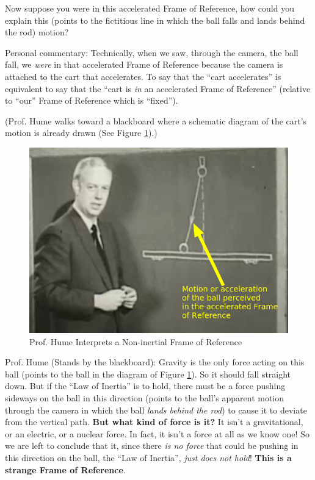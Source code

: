 \documentclass[a6paper]{article}
\newcommand{\perscom}[1]{
    {\footnotesize Personal commentary:  #1}
}
\begin{document}
Now suppose you were in this accelerated Frame of Reference, how could you explain this (points to the fictitious line in which the ball falls and lands behind the rod) motion?

\perscom{ Technically, when we saw, through the camera, the ball fall, we \emph{were} in that accelerated Frame of Reference because the camera is attached to the cart that accelerates. To say that the ``cart accelerates'' is equivalent to say that the ``cart is \emph{in} an accelerated Frame of Reference'' (relative to ``our'' Frame of Reference which is ``fixed'').}

(Prof. Hume walks toward a blackboard where a schematic diagram of the cart's motion is already drawn (See Figure \ref{fig: prof-hume-interprets-non-inertial-frame}).)

        \begin{figure}[h!]
            \centering
            \includegraphics[width=0.5\linewidth]{prof-hume-interprets-non-inertial-frame.png}
            \caption{Prof. Hume Interprets a Non-inertial Frame of Reference}
            \label{fig: prof-hume-interprets-non-inertial-frame}
        \end{figure}

Prof. Hume (Stands by the blackboard): Gravity is the only force acting on this ball (points to the ball in the diagram of Figure \ref{fig: prof-hume-interprets-non-inertial-frame}). So it should fall straight down. But if the ``Law of Inertia'' is to hold, there must be a force pushing sideways on the ball in this direction (points to the ball's apparent motion through the camera in which the ball \emph{lands behind the rod}) to cause it to deviate from the vertical path. \textbf{But what kind of force is it?} It isn't a gravitational, or an electric, or a nuclear force. In fact, it isn't a force at all as we know one! So we are left to conclude that it, since there \emph{is no force} that could be pushing in this direction on the ball, the ``Law of Inertia'', \emph{just does not hold}! \textbf {This is a strange Frame of Reference}. 
\end{document}
